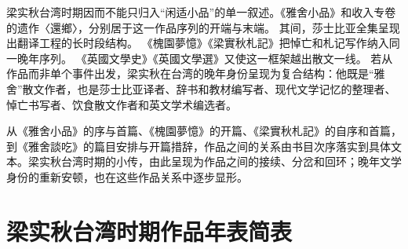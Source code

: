 \documentclass[UTF8,a4paper,zihao=-4,fontset=none]{ctexart}
\begin{document}
梁实秋台湾时期因而不能只归入“闲适小品”的单一叙述。《雅舍小品》和收入专卷的遗作〈還鄉〉，分别居于这一作品序列的开端与末端。\cite{liang_yashe_xiaopin_ncl_scan,1987還鄉} 其间，莎士比亚全集呈现出翻译工程的长时段结构。\autocite{shakespeare1968_liang_quanji,nmtl_liang_chronology} 《槐園夢憶》《梁實秋札記》把悼亡和札记写作纳入同一晚年序列。\autocite{liang_huaiyuan_mengyi_fareast_scan_pages,liang1981_zhaji_4th} 《英國文學史》《英國文學選》又使这一框架越出散文一线。\autocite{liang1985_yingguo_wenxueshi,liang1985_yingguo_wenxuan} 若从作品而非单个事件出发，梁实秋在台湾的晚年身份呈现为复合结构：他既是“雅舍”散文作者，也是莎士比亚译者、辞书和教材编写者、现代文学记忆的整理者、悼亡书写者、饮食散文作者和英文学术编选者。

从《雅舍小品》的序与首篇、《槐園夢憶》的开篇、《梁實秋札記》的自序和首篇，到《雅舍談吃》的篇目安排与开篇措辞，作品之间的关系由书目次序落实到具体文本。梁实秋台湾时期的小传，由此呈现为作品之间的接续、分岔和回环；晚年文学身份的重新安顿，也在这些作品关系中逐步显形。

\clearpage
\printbibliography[title={参考文献}]

\clearpage
\appendix
\section{梁实秋台湾时期作品年表简表}
\end{document}
